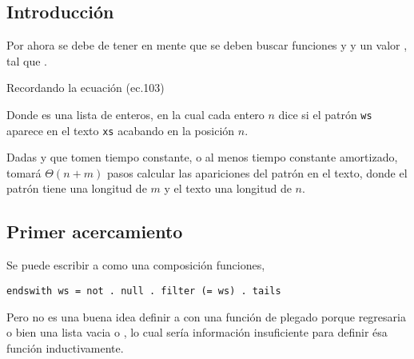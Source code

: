 

\subsection{Introducción}

Por ahora se debe de tener en mente que se deben buscar funciones  y  y un
valor , tal que .

Recordando la ecuación (ec.103) %

Donde  es una lista de enteros, en la cual cada entero $n$ dice si el patrón
\texttt{ws} aparece en el texto \texttt{xs} acabando en la posición $n$.

Dadas  y  que tomen tiempo constante, o al menos tiempo constante amortizado,
 tomará $\Theta(n + m)$ pasos calcular las apariciones del patrón en el texto, donde
el patrón tiene una longitud de $m$ y el texto una longitud de $n$.


\subsection{Primer acercamiento}

Se puede escribir a  como una composición funciones,
\begin{verbatim}
endswith ws = not . null . filter (= ws) . tails
\end{verbatim}

Pero no es una buena idea definir a  con una función de plegado
 porque regresaria o bien una lista vacia o \hsCode{[ws]}, lo cual sería información
insuficiente para definir ésa función inductivamente.

